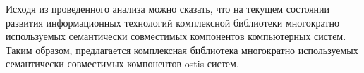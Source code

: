 Исходя из проведенного анализа можно сказать, что на текущем состоянии развития информационных технологий  комплексной библиотеки многократно используемых семантически совместимых компонентов компьютерных систем. Таким образом, предлагается комплексная библиотека многократно используемых семантически совместимых компонентов ostis-систем.

